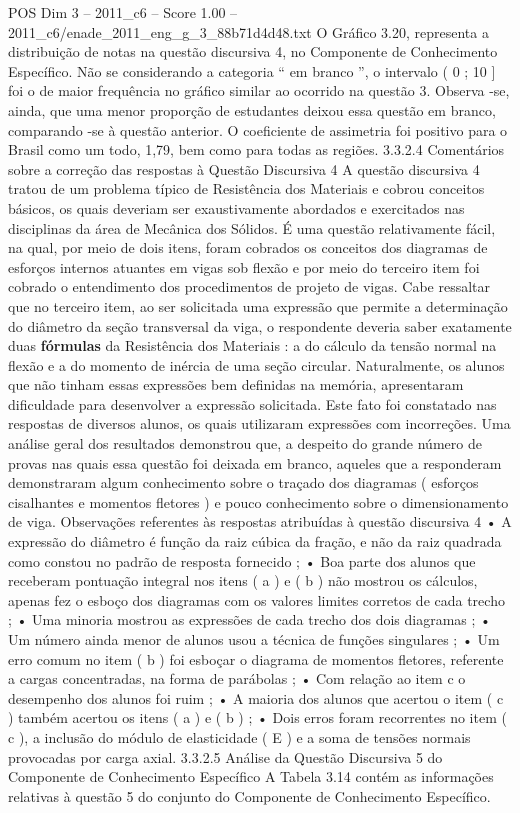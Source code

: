 \begin{textsample}{POS Dim 3 – 2011\_c6 – Score 1.00 – 2011\_c6/enade\_2011\_eng\_g\_3\_88b71d4d48.txt}
O Gráfico 3.20, representa a distribuição de notas na questão discursiva 4, no Componente de Conhecimento Específico.
Não se considerando a categoria “ em branco ”, o intervalo ( 0 ; 10 ] foi o de maior frequência no gráfico similar ao ocorrido na questão 3.
Observa -se, ainda, que uma menor proporção de estudantes deixou essa questão em branco, comparando -se à questão anterior.
O coeficiente de assimetria foi positivo para o Brasil como um todo, 1,79, bem como para todas as regiões. 3.3.2.4 Comentários sobre a correção das respostas à Questão Discursiva 4 A questão discursiva 4 tratou de um problema típico de Resistência dos Materiais e cobrou conceitos básicos, os quais deveriam ser exaustivamente abordados e exercitados nas disciplinas da área de Mecânica dos Sólidos.
É uma questão relativamente fácil, na qual, por meio de dois itens, foram cobrados os conceitos dos diagramas de esforços internos atuantes em vigas sob flexão e por meio do terceiro item foi cobrado o entendimento dos procedimentos de projeto de vigas.
Cabe ressaltar que no terceiro item, ao ser solicitada uma expressão que permite a determinação do diâmetro da seção transversal da viga, o respondente deveria saber exatamente duas \textbf{fórmulas} da Resistência dos Materiais : a do cálculo da tensão normal na flexão e a do momento de inércia de uma seção circular.
Naturalmente, os alunos que não tinham essas expressões bem definidas na memória, apresentaram dificuldade para desenvolver a expressão solicitada.
Este fato foi constatado nas respostas de diversos alunos, os quais utilizaram expressões com incorreções.
Uma análise geral dos resultados demonstrou que, a despeito do grande número de provas nas quais essa questão foi deixada em branco, aqueles que a responderam demonstraram algum conhecimento sobre o traçado dos diagramas ( esforços cisalhantes e momentos fletores ) e pouco conhecimento sobre o dimensionamento de viga.
Observações referentes às respostas atribuídas à questão discursiva 4 • A expressão do diâmetro é função da raiz cúbica da fração, e não da raiz quadrada como constou no padrão de resposta fornecido ; • Boa parte dos alunos que receberam pontuação integral nos itens ( a ) e ( b ) não mostrou os cálculos, apenas fez o esboço dos diagramas com os valores limites corretos de cada trecho ; • Uma minoria mostrou as expressões de cada trecho dos dois diagramas ; • Um número ainda menor de alunos usou a técnica de funções singulares ; • Um erro comum no item ( b ) foi esboçar o diagrama de momentos fletores, referente a cargas concentradas, na forma de parábolas ; • Com relação ao item c o desempenho dos alunos foi ruim ; • A maioria dos alunos que acertou o item ( c ) também acertou os itens ( a ) e ( b ) ; • Dois erros foram recorrentes no item ( c ), a inclusão do módulo de elasticidade ( E ) e a soma de tensões normais provocadas por carga axial. 3.3.2.5 Análise da Questão Discursiva 5 do Componente de Conhecimento Específico A Tabela 3.14 contém as informações relativas à questão 5 do conjunto do Componente de Conhecimento Específico.

\end{textsample}
